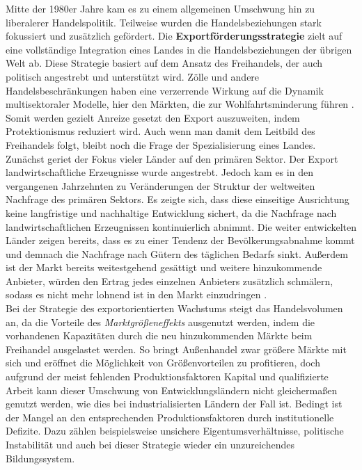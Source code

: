 Mitte der 1980er Jahre kam es zu einem allgemeinen Umschwung hin zu liberalerer Handelspolitik. Teilweise wurden die Handelsbeziehungen stark fokussiert und zus{\"a}tzlich gef{\"o}rdert. Die \textbf{Exportf{\"o}rderungsstrategie} zielt auf eine vollst{\"a}ndige Integration eines Landes in die Handelsbeziehungen der {\"u}brigen Welt ab. Diese Strategie basiert auf dem Ansatz des Freihandels, der auch politisch angestrebt und unterst{\"u}tzt wird. Z{\"o}lle und andere Handelsbeschr{\"a}nkungen haben eine verzerrende Wirkung auf die Dynamik multisektoraler Modelle, hier den M{\"a}rkten, die zur Wohlfahrtsminderung f{\"u}hren \cite{Ortigueira.2002}. Somit werden gezielt Anreize gesetzt den Export auszuweiten, indem Protektionismus reduziert wird. Auch wenn man damit dem Leitbild des Freihandels folgt, bleibt noch die Frage der Spezialisierung eines Landes. 
Zun{\"a}chst geriet der Fokus vieler L{\"a}nder auf den prim{\"a}ren Sektor. Der Export landwirtschaftliche Erzeugnisse wurde angestrebt. Jedoch kam es in den vergangenen Jahrzehnten zu Ver{\"a}nderungen der Struktur der weltweiten Nachfrage des prim{\"a}ren Sektors. Es zeigte sich, dass diese einseitige Ausrichtung keine langfristige und nachhaltige Entwicklung sichert, da die Nachfrage nach landwirtschaftlichen Erzeugnissen  kontinuierlich abnimmt. Die weiter entwickelten L{\"a}nder zeigen bereits, dass es zu einer Tendenz der Bev{\"o}lkerungsabnahme kommt und demnach die Nachfrage nach G{\"u}tern des t{\"a}glichen Bedarfs sinkt. Au{\ss}erdem ist der Markt bereits weitestgehend ges{\"a}ttigt und weitere hinzukommende Anbieter, w{\"u}rden den Ertrag jedes einzelnen Anbieters zus{\"a}tzlich schm{\"a}lern, sodass es nicht mehr lohnend ist in den Markt einzudringen \citep{Muller.2005,Lachmann.1994}.\\


Bei der Strategie des exportorientierten Wachstums steigt das Handelsvolumen an, da die Vorteile des \textit{Marktgr{\"o}{\ss}eneffekts} ausgenutzt werden, indem die vorhandenen Kapazit{\"a}ten durch die neu hinzukommenden M{\"a}rkte beim Freihandel ausgelastet werden. 
So bringt Au{\ss}enhandel zwar gr{\"o}{\ss}ere M{\"a}rkte mit sich und er{\"o}ffnet die M{\"o}glichkeit von Gr{\"o}{\ss}envorteilen zu profitieren, doch aufgrund der meist fehlenden Produktionsfaktoren Kapital und qualifizierte Arbeit kann dieser Umschwung von Entwicklungsl{\"a}ndern nicht gleicherma{\ss}en genutzt werden, wie dies bei industrialisierten L{\"a}ndern der Fall ist. Bedingt ist der Mangel an den entsprechenden Produktionsfaktoren durch institutionelle Defizite. Dazu z{\"a}hlen beispielsweise unsichere Eigentumsverh{\"a}ltnisse, politische Instabilit{\"a}t und auch bei dieser Strategie wieder ein unzureichendes Bildungssystem.\\


